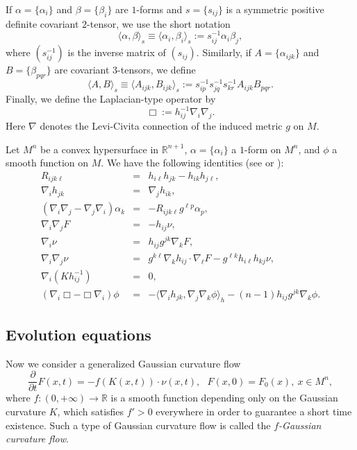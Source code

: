 \documentclass{amsart}
\theoremstyle{definition}
\theoremstyle{remark}
\numberwithin{equation}{section}
\begin{document}
If $\alpha=\{\alpha_{i}\}$ and $\beta=\{\beta_{i}\}$ are $1$-forms and $s=\{s_{ij}\}$ is a symmetric positive
definite covariant $2$-tensor, we use the short notation
\begin{equation*}
\langle \alpha,\beta\rangle_{s}\equiv\langle \alpha_{i},\beta_{i}\rangle_{s}:=s^{-1}_{ij}\alpha_{i}\beta_{j},
\end{equation*}
where $(s^{-1}_{ij})$ is the inverse matrix of $(s_{ij})$. Similarly, if $A=\{\alpha_{ijk}\}$ and $B=\{\beta_{pqr}\}$ are covariant $3$-tensors, we define
\begin{equation*}
\langle A,B\rangle_{s}\equiv\langle A_{ijk},B_{ijk}\rangle_{s}:=s^{-1}_{ip}s^{-1}_{jq}s^{-1}_{kr}A_{ijk}B_{pqr}.\label{3.2.6}
\end{equation*}
Finally, we define the Laplacian-type operator by
\begin{equation}
\Box:=h^{-1}_{ij}\nabla_{i}\nabla_{j}.\label{2.5}
\end{equation}
Here $\nabla$ denotes the Levi-Civita connection of the induced metric $g$ on $M$.

Let $M^{n}$ be a convex hypersurface in $\mathbb{R}^{n+1}$, $\alpha=\{\alpha_{i}\}$
a $1$-form on $M^{n}$, and $\phi$ a smooth function on $M$. We have the following identities (see \cite{C1}
or \cite{C2}):
\begin{eqnarray}
R_{ijk\ell}&=&h_{i\ell}h_{jk}-h_{ik}h_{j\ell},\label{2.6}\\
\nabla_{i}h_{jk}&=&\nabla_{j}h_{ik},\label{2.7}\\
(\nabla_{i}\nabla_{j}-\nabla_{j}\nabla_{i})\alpha_{k}
&=&-R_{ijk\ell}g^{\ell p}\alpha_{p},\label{2.8}\\
\nabla_{i}\nabla_{j}F&=&-h_{ij}\nu,\label{2.9}\\
\nabla_{i}\nu&=&h_{ij}g^{jk}\nabla_{k}F,\label{2.10}\\
\nabla_{i}\nabla_{j}\nu&=&g^{k\ell}\nabla_{k}h_{ij}\cdot\nabla_{\ell}F
-g^{\ell k}h_{i\ell}h_{kj}\nu,\label{2.11}\\
\nabla_{i}\left(Kh^{-1}_{ij}\right)&=&0,\label{2.12}\\
\left(\nabla_{i}\Box-\Box\nabla_{i}\right)\phi&=&-\langle\nabla_{i}h_{jk},
\nabla_{j}\nabla_{k}\phi\rangle_{h}
-(n-1)h_{ij}g^{jk}\nabla_{k}\phi.\label{2.13}
\end{eqnarray}

\subsection{Evolution equations}
Now we consider a generalized Gaussian curvature flow
\begin{equation}
\frac{\partial}{\partial t}F(x,t)=-f(K(x,t))\cdot\nu(x,t), \ \ \ F(x,0)=F_{0}(x), \
x\in M^{n},\label{2.14}
\end{equation}
where $f: (0,+\infty)\to\mathbb{R}$ is a smooth function depending only on the Gaussian
curvature $K$, which satisfies $f'>0$ everywhere in order to guarantee 
a short time existence. Such a type of Gaussian curvature flow is called the {\it
$f$-Gaussian curvature flow}.
\end{document}
